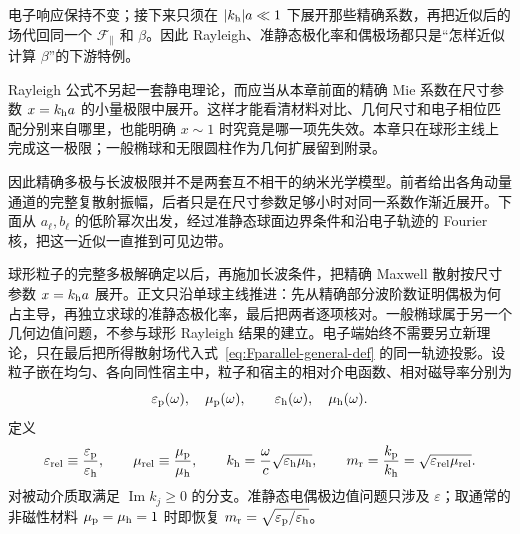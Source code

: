 电子响应保持不变；接下来只须在 \(|k_{\rm h}|a\ll1\) 下展开那些精确系数，再把近似后的场代回同一个 \(\mathcal F_{\parallel}\) 和 \(\beta\)。因此 Rayleigh、准静态极化率和偶极场都只是“怎样近似计算 \(\beta\)”的下游特例。

Rayleigh 公式不另起一套静电理论，而应当从本章前面的精确 Mie 系数在尺寸参数 $x=k_{\rm h}a$ 的小量极限中展开。这样才能看清材料对比、几何尺寸和电子相位匹配分别来自哪里，也能明确 $x\sim1$ 时究竟是哪一项先失效。本章只在球形主线上完成这一极限；一般椭球和无限圆柱作为几何扩展留到附录。

因此精确多极与长波极限并不是两套互不相干的纳米光学模型。前者给出各角动量通道的完整复散射振幅，后者只是在尺寸参数足够小时对同一系数作渐近展开。下面从 $a_\ell,b_\ell$ 的低阶幂次出发，经过准静态球面边界条件和沿电子轨迹的 Fourier 核，把这一近似一直推到可见边带。\par\medskip

球形粒子的完整多极解确定以后，再施加长波条件，把精确 Maxwell 散射按尺寸参数 $x=k_{\rm h}a$ 展开。正文只沿单球主线推进：先从精确部分波阶数证明偶极为何占主导，再独立求球的准静态极化率，最后把两者逐项核对。一般椭球属于另一个几何边值问题，不参与球形 Rayleigh 结果的建立。电子端始终不需要另立新理论，只在最后把所得散射场代入式~\cref{eq:Fparallel-general-def} 的同一轨迹投影。设粒子嵌在均匀、各向同性宿主中，粒子和宿主的相对介电函数、相对磁导率分别为
\begin{equation}
\varepsilon_{\rm p}(\omega),\quad \mu_{\rm p}(\omega),
\qquad
\varepsilon_{\rm h}(\omega),\quad \mu_{\rm h}(\omega).
\end{equation}
定义
\begin{equation}
\varepsilon_{\rm rel}\equiv\frac{\varepsilon_{\rm p}}{\varepsilon_{\rm h}},
\qquad
\mu_{\rm rel}\equiv\frac{\mu_{\rm p}}{\mu_{\rm h}},
\qquad
k_{\rm h}=\frac{\omega}{c}
\sqrt{\varepsilon_{\rm h}\mu_{\rm h}},
\qquad
m_{\rm r}=\frac{k_{\rm p}}{k_{\rm h}}
=\sqrt{\varepsilon_{\rm rel}\mu_{\rm rel}}.
\label{eq:host-wave-number}
\end{equation}
对被动介质取满足 $\operatorname{Im}k_j\ge0$ 的分支。准静态电偶极边值问题只涉及 $\varepsilon$；取通常的非磁性材料 $\mu_{\rm p}=\mu_{\rm h}=1$ 时即恢复
$m_{\rm r}=\sqrt{\varepsilon_{\rm p}/\varepsilon_{\rm h}}$。


